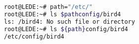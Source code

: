 \begin{lstlisting}[language=bash,caption={Variable encapsulation.}]
root@LEDE:~# path="/etc/"
root@LEDE:~# ls $pathconfig/bird4
ls: /bird4: No such file or directory
root@LEDE:~# ls ${path}config/bird4
/etc/config/bird4
\end{lstlisting}